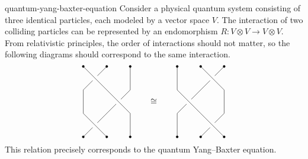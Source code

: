 \begin{example}{quantum-yang-baxter-equation}
    Consider a physical quantum system consisting of three identical particles, each modeled by a vector space $V$. The interaction of two colliding particles can be represented by an endomorphism $R : V \otimes V \to V \otimes V$. From relativistic principles, the order of interactions should not matter, so the following diagrams should correspond to the same interaction.
    \[ \begin{tikzpicture}
        \begin{scope}
            \draw[black,fill=black] (0, 0) circle (.3ex);
            \draw[black,fill=black] (1, 0) circle (.3ex);
            \draw[black,fill=black] (2, 0) circle (.3ex);
            \draw[black,fill=black] (0, 3) circle (.3ex);
            \draw[black,fill=black] (1, 3) circle (.3ex);
            \draw[black,fill=black] (2, 3) circle (.3ex);
            \draw (0, 3) -- (1, 2) -- (2, 1) -- (2, 0);
            \draw (1, 3) -- (0.6, 2.6);
            \draw (0.4, 2.4) -- (0, 2) -- (0, 1) -- (1, 0);
            \draw (2, 3) -- (2, 2) -- (1.6, 1.6);
            \draw (1.4, 1.4) -- (0.6, 0.6);
            \draw (0.4, 0.4) -- (0, 0);
        \end{scope}
        \node at (3cm,1.5cm) {$\isom$};
        \begin{scope}[xshift=4cm]
            \draw[black,fill=black] (0, 0) circle (.3ex);
            \draw[black,fill=black] (1, 0) circle (.3ex);
            \draw[black,fill=black] (2, 0) circle (.3ex);
            \draw[black,fill=black] (0, 3) circle (.3ex);
            \draw[black,fill=black] (1, 3) circle (.3ex);
            \draw[black,fill=black] (2, 3) circle (.3ex);
            \draw (0, 3) -- (0, 2) -- (1, 1) -- (2, 0);
            \draw (1, 3) -- (2, 2) -- (2, 1) -- (1.6, 0.6);
            \draw (1.4, 0.4) -- (1, 0);
            \draw (2, 3) -- (1.6, 2.6);
            \draw (1.4, 2.4) -- (0.6, 1.6);
            \draw (0.4, 1.4) -- (0, 1) -- (0, 0);
        \end{scope}
    \end{tikzpicture} \]
    This relation precisely corresponds to the quantum Yang--Baxter equation.
\end{example}
